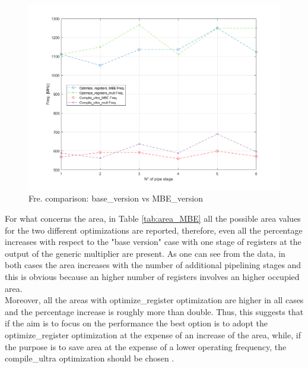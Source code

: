 \documentclass[a4paper, titlepage]{article}
\begin{document}
\begin{figure}[htp]
\centering
\includegraphics[scale=0.4]{mult_vs_MBE.png}
	\caption{Fre. comparison: base\_version vs MBE\_version}
	\label{fig:MBE vs mult}
\end{figure}
\noindent
For what concerns the area, in Table \ref{tab:area_MBE} 
all the possible area values for the two different optimizations are reported, therefore, even all the percentage increases with respect to the "base version" case with one stage of registers at the output of the generic multiplier are present.
\newline As one can see from the data, in both cases the area increases with the number of additional pipelining stages and this is obvious because an higher number of registers involves an higher occupied area.\\
Moreover, all the areas with optimize\_register optimization are higher in all cases and the percentage increase is roughly more than double.
\newline
Thus, this suggests that if the aim is to focus on the performance the best option is to adopt the optimize\_register optimization at the expense of an increase of the area, while, if the purpose is to save area at the expense of a lower operating frequency, the compile\_ultra optimization should be chosen .

\newpage
\end{document}
